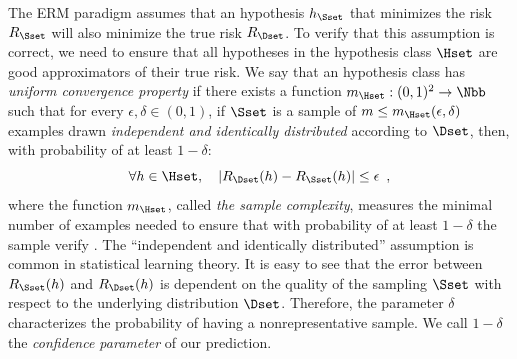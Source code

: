 The ERM paradigm assumes that an hypothesis $h_\Sset$ that minimizes the risk $R_\Sset$ will also minimize the true risk $R_\Dset$.
To verify that this assumption is correct, we need to ensure that all hypotheses in the hypothesis class $\Hset$ are good approximators of their true risk.
We say that an hypothesis class has \emph{uniform convergence property} if there exists a function $m_\Hset:(0, 1)^2 \rightarrow \Nbb$ such that for every $\epsilon, \delta \in (0, 1)$, if $\Sset$ is a sample of $m \leq m_\Hset(\epsilon, \delta)$ examples drawn \emph{independent and identically distributed} according to $\Dset$, then, with probability of at least $1 - \delta$:
\begin{equation} \label{equation:ch2-eps_representative}
  \forall h \in \Hset, \quad |R_\Dset(h) - R_\Sset(h)| \leq \epsilon \enspace,
\end{equation}
where the function $m_\Hset$, called \emph{the sample complexity}, measures the minimal number of examples needed to ensure that with probability of at least $1 - \delta$ the sample verify .
The ``independent and identically distributed'' assumption is common in statistical learning theory.
It is easy to see that the error between $R_\Sset(h)$ and $R_\Dset(h)$ is dependent on the quality of the sampling $\Sset$ with respect to the underlying distribution $\Dset$.
Therefore, the parameter $\delta$ characterizes the probability of having a nonrepresentative sample. We call $1 - \delta$ the \emph{confidence parameter} of our prediction.



